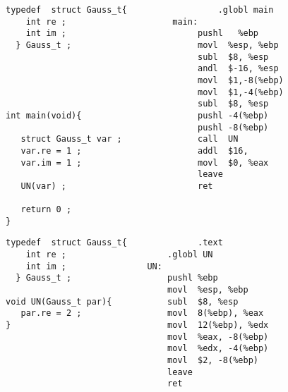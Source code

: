 \begin{frame}[fragile]
\begin{verbatim}
typedef  struct Gauss_t{                  .globl main   
    int re ;                     main:             
    int im ;                          pushl   %ebp    
  } Gauss_t ;                         movl  %esp, %ebp  
                                      subl  $8, %esp    
                                      andl  $-16, %esp  
                                      movl  $1,-8(%ebp) 
                                      movl  $1,-4(%ebp) 
                                      subl  $8, %esp   
int main(void){                       pushl -4(%ebp)    
                                      pushl -8(%ebp)    
   struct Gauss_t var ;               call  UN      
   var.re = 1 ;                       addl  $16,
   var.im = 1 ;                       movl  $0, %eax   
                                      leave         
   UN(var) ;                          ret             

   return 0 ; 
}                                     
\end{verbatim}
\end{frame}
\begin{frame}[fragile]
\begin{verbatim}
typedef  struct Gauss_t{              .text            
    int re ;                    .globl UN              
    int im ;                UN:                        
  } Gauss_t ;                   pushl %ebp             
                                movl  %esp, %ebp       
void UN(Gauss_t par){           subl  $8, %esp         
   par.re = 2 ;                 movl  8(%ebp), %eax    
}                               movl  12(%ebp), %edx   
                                movl  %eax, -8(%ebp)   
                                movl  %edx, -4(%ebp)   
                                movl  $2, -8(%ebp)     
                                leave                  
                                ret                    
\end{verbatim}
\end{frame}
